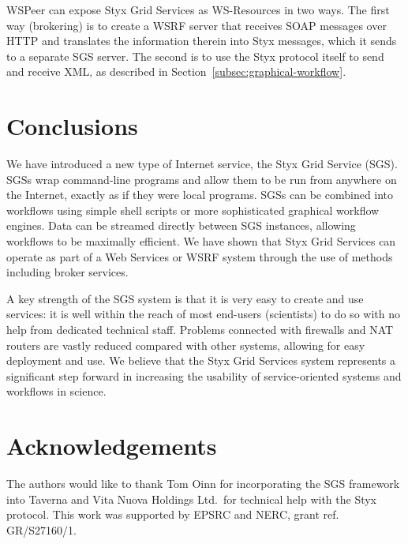 \documentclass{llncs}
\begin{document}
WSPeer can expose Styx Grid Services as WS-Resources in two ways.  The first way (brokering) is to create a WSRF server that receives SOAP messages over HTTP and translates the information therein into Styx messages, which it sends to a separate SGS server.  The second is to use the Styx protocol itself to send and receive XML, as described in Section~\ref{subsec:graphical-workflow}.


\section{Conclusions}
We have introduced a new type of Internet service, the Styx Grid Service (SGS).  SGSs wrap command-line programs and allow them to be run from anywhere on the Internet, exactly as if they were local programs.  SGSs can be combined into workflows using simple shell scripts or more sophisticated graphical workflow engines.  Data can be streamed directly between SGS instances, allowing workflows to be maximally efficient.  We have shown that Styx Grid Services can operate as part of a Web Services or WSRF system through the use of methods including broker services.

A key strength of the SGS system is that it is very easy to create and use services: it is well within the reach of most end-users (scientists) to do so with no help from dedicated technical staff.  Problems connected with firewalls and NAT routers are vastly reduced compared with other systems, allowing for easy deployment and use.  We believe that the Styx Grid Services system represents a significant step forward in increasing the usability of service-oriented systems and workflows in science.
%

\section*{Acknowledgements}
The authors would like to thank Tom Oinn for incorporating the SGS framework into Taverna and Vita Nuova Holdings Ltd.\ for technical help with the Styx protocol.  This work was supported by EPSRC and NERC, grant ref. GR/S27160/1.

%
%


\end{document}
